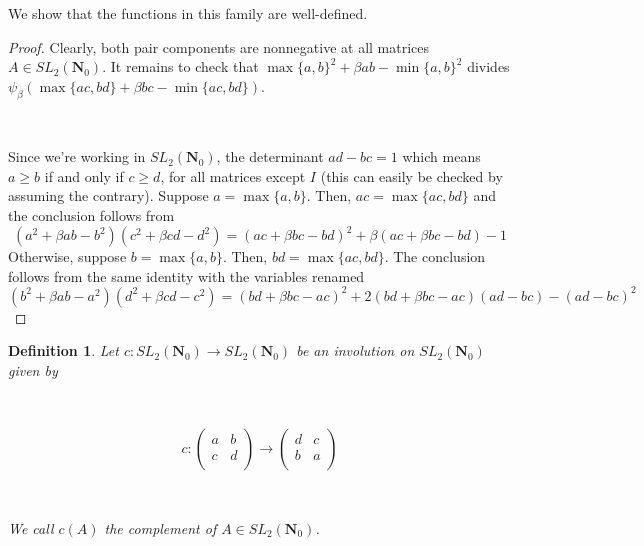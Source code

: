 \documentclass{article}
\newtheorem{definition}[theorem]{Definition}  %
\begin{document}
We show that the functions in this family are well-defined.

\begin{proof}
Clearly, both pair components are nonnegative at all matrices $A \in SL_2(\mathbf{N}_0)$. It remains to check that $\max \{a, b\}^2 + \beta ab - \min \{a, b \}^2$ divides $\psi_\beta(\max \{ac, bd \} + \beta bc - \min \{ac, bd\})$.

\

Since we're working in $SL_2(\mathbf{N}_0)$, the determinant $ad - bc = 1$ which means $a \geq b$ if and only if $c \geq d$, for all matrices except $I$ (this can easily be checked by assuming the contrary). Suppose $a = \max \{ a, b \}$. Then, $ac = \max \{ ac, bd \}$ and the conclusion follows from 
\[(a^2 + \beta ab - b^2)(c^2 + \beta cd - d^2) = (ac + \beta bc - bd)^2 + \beta (ac + \beta bc - bd) - 1\]
Otherwise, suppose $b = \max \{ a, b \}$. Then, $bd = \max \{ ac, bd \}$. The conclusion follows from the same identity with the variables renamed
\[(b^2 + \beta ab - a^2)(d^2 + \beta cd - c^2) = (bd + \beta bc - ac)^2 + 2(bd + \beta bc - ac)(ad - bc) - (ad-bc)^2\]

\end{proof}


\begin{definition}
Let $c: SL_2(\mathbf{N}_0) \rightarrow SL_2(\mathbf{N}_0)$ be an involution on $SL_2(\mathbf{N}_0)$ given by

\

$$c: \begin{pmatrix}
    a & b \\
    c & d \\
\end{pmatrix} \rightarrow 
\begin{pmatrix} 
d & c \\ 
b & a \\
\end{pmatrix}
$$

\

We call $c(A)$ the complement of $A \in SL_2(\mathbf{N}_0)$.
\end{definition}
\end{document}

